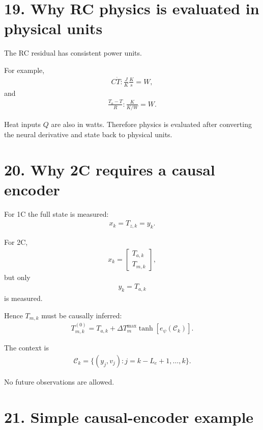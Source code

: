 \documentclass[11pt]{article}
\begin{document}
\section*{19. Why RC physics is evaluated in physical units}

The RC residual has consistent power units.

For example,
\begin{align}
\boxed{
C\dot T
:
\frac{J}{K}\frac{K}{s}=W,
}
\tag{P4.87}
\end{align}
and
\begin{align}
\boxed{
\frac{T_o-T}{R}
:
\frac{K}{K/W}=W.
}
\tag{P4.88}
\end{align}

Heat inputs \(Q\) are also in watts. Therefore physics is evaluated after converting the neural derivative and state back to physical units.

\section*{20. Why 2C requires a causal encoder}

For 1C the full state is measured:
\begin{align}
\boxed{x_k=T_{z,k}=y_k.}
\tag{P4.89}
\end{align}

For 2C,
\begin{align}
\boxed{
x_k=
\begin{bmatrix}
T_{a,k}\\T_{m,k}
\end{bmatrix},
}
\tag{P4.90}
\end{align}
but only
\begin{align}
\boxed{y_k=T_{a,k}}
\tag{P4.91}
\end{align}
is measured.

Hence \(T_{m,k}\) must be causally inferred:
\begin{align}
\boxed{
T_{m,k}^{(0)}
=
T_{a,k}
+
\Delta T_m^{\max}
\tanh[e_\psi(\mathcal C_k)].
}
\tag{P4.92}
\end{align}

The context is
\begin{align}
\boxed{
\mathcal C_k
=
\{(y_j,v_j):j=k-L_e+1,\ldots,k\}.
}
\tag{P4.93}
\end{align}

No future observations are allowed.

\section*{21. Simple causal-encoder example}
\end{document}
